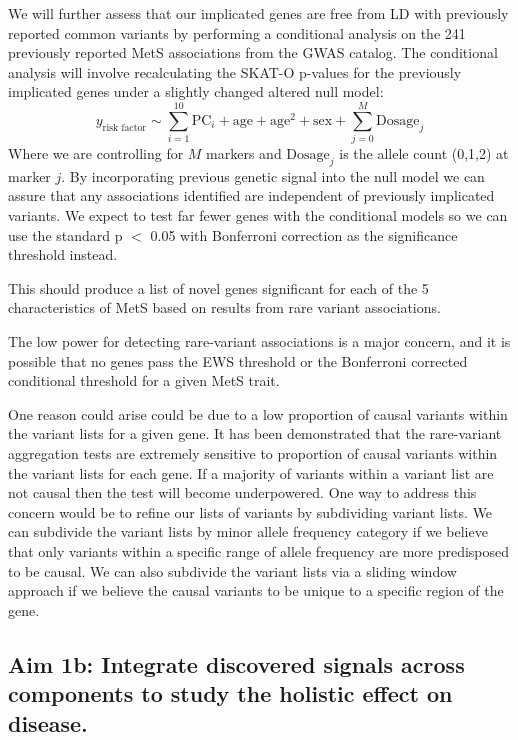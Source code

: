 \documentclass[11pt]{article}
\begin{document}
We will further assess that our implicated genes are free from LD with previously reported common variants by performing a conditional analysis on the 241 previously reported MetS associations from the GWAS catalog. The conditional analysis will involve recalculating the SKAT-O p-values for the previously implicated genes under a slightly changed altered null model:
$$y_{\text{risk factor}} \sim \sum_{i=1}^{10} \text{PC}_i + \text{age} + \text{age}^2 + \text{sex} + \sum_{j=0}^{M}\text{Dosage}_j$$
Where we are controlling for $M$ markers and $\text{Dosage}_j$ is the allele count (0,1,2) at marker $j$. By incorporating previous genetic signal into the null model we can assure that any associations identified are independent of previously implicated variants. We expect to test far fewer genes with the conditional models so we can use the standard p $<$ 0.05 with Bonferroni correction as the significance threshold instead.

This should produce a list of novel genes significant for each of the 5 characteristics of MetS based on results from rare variant associations.

\noindent {} 

The low power for detecting rare-variant associations is a major concern, and it is possible that no genes pass the EWS threshold or the Bonferroni corrected conditional threshold for a given MetS trait.

One reason could arise could be due to a low proportion of causal variants within the variant lists for a given gene. It has been demonstrated that the rare-variant aggregation tests are extremely sensitive to proportion of causal variants within the variant lists for each gene. If a majority of variants within a variant list are not causal then the test will become underpowered. One way to address this concern would be to refine our lists of variants by subdividing variant lists. We can subdivide the variant lists by minor allele frequency category if we believe that only variants within a specific range of allele frequency are more predisposed to be causal. We can also subdivide the variant lists via a sliding window approach if we believe the causal variants to be unique to a specific region of the gene.

\subsection*{Aim 1b: Integrate discovered signals across components to study the holistic effect on disease.} 
\end{document}
